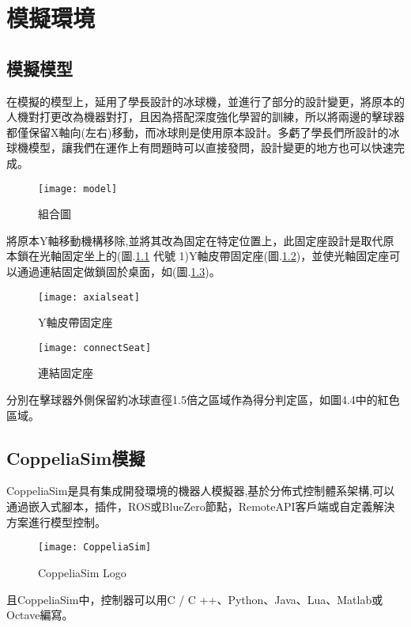 \chapter{模擬環境}
\section{模擬模型}
 在模擬的模型上，延用了學長設計的冰球機，並進行了部分的設計變更，將原本的人機對打更改為機器對打，且因為搭配深度強化學習的訓練，所以將兩邊的擊球器都僅保留X軸向(左右)移動，而冰球則是使用原本設計。多虧了學長們所設計的冰球機模型，讓我們在運作上有問題時可以直接發問，設計變更的地方也可以快速完成。\\
\begin{figure}[hbt!]
\center
\texttt{[image: model]}
\caption{\Large 組合圖}
\label{model}
\end{figure}

\qquad 將原本Y軸移動機構移除,並將其改為固定在特定位置上，此固定座設計是取代原本鎖在光軸固定坐上的(圖.\ref{model} 代號 1)Y軸皮帶固定座(圖.\ref{axialseat})，並使光軸固定座可以通過連結固定做鎖固於桌面，如(圖.\ref{connectSeat})。\\

\begin{figure}[hbt!]
\center
\texttt{[image: axialseat]}
\caption{\Large Y軸皮帶固定座}
\label{axialseat}
\end{figure}

\begin{figure}[hbt!]
\center
\texttt{[image: connectSeat]}
\caption{\Large 連結固定座}
\label{connectSeat}
\end{figure}

\newpage
\qquad 分別在擊球器外側保留約冰球直徑1.5倍之區域作為得分判定區，如圖4.4中的紅色區域。\\
\section{CoppeliaSim模擬}
 CoppeliaSim是具有集成開發環境的機器人模擬器,基於分佈式控制體系架構,可以通過嵌入式腳本，插件，ROS或BlueZero節點，RemoteAPI客戶端或自定義解決方案進行模型控制。\\
 \begin{figure}[hbt!]
\center
\texttt{[image: CoppeliaSim]}
\caption{\Large CoppeliaSim Logo}
\end{figure}

且CoppeliaSim中，控制器可以用C / C ++、Python、Java、Lua、Matlab或Octave編寫。\\
